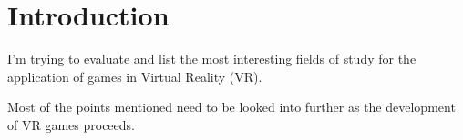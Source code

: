\section{Introduction}
I'm trying to evaluate and list the most interesting fields of study for the application of games in Virtual Reality (VR).

Most of the  points mentioned need to be looked into further as the development of VR games proceeds.